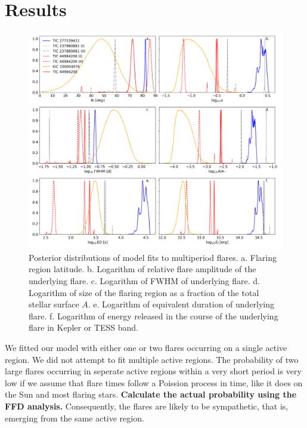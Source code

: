 \documentclass[fleqn,usenatbib,letters]{mnras}%
\begin{document}
\section{Results}
\begin{figure}
	\includegraphics[width=\hsize]{figures/21_08_2020_posteriors.png}
    \caption{Posterior distributions of model fits to multiperiod flares. a. Flaring region latitude. b. Logarithm of relative flare amplitude of the underlying flare. c. Logarithm of FWHM of underlying flare. d. Logarithm of size of the flaring region as a fraction of the total stellar surface $A$. e. Logarithm of equivalent duration of underlying flare. f. Logarithm of energy released in the course of the underlying flare in Kepler or TESS band.}
    \label{fig:posteriors}
\end{figure}

We fitted our model with either one or two flares occurring on a single active region. We did not attempt to fit multiple active regions. The probability of two large flares occurring in seperate active regions within a very short period is very low if we assume that flare times follow a Poission process in time, like it does on the Sun and most flaring stars. \textbf{Calculate the actual probability using the FFD analysis.} Consequently, the flares are likely to be sympathetic, that is, emerging from the same active region.

\label{sec:results}
\end{document}
